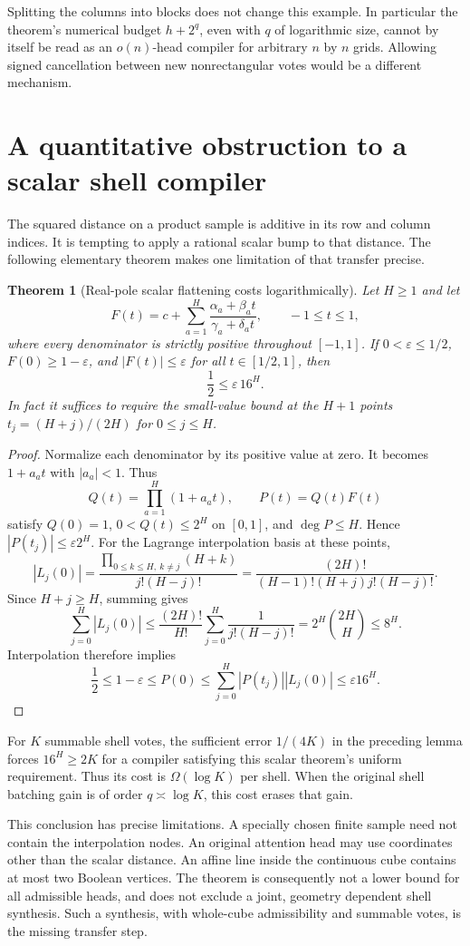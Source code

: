 \documentclass[11pt]{article}
\newtheorem{theorem}{Theorem}
\begin{document}
Splitting the columns into blocks does not change this example. In
particular the theorem's numerical budget $h+2^q$, even with
$q$ of logarithmic size, cannot by itself be read as an $o(n)$-head
compiler for arbitrary $n$ by $n$ grids. Allowing signed cancellation
between new nonrectangular votes would be a different mechanism.

\section{A quantitative obstruction to a scalar shell compiler}

The squared distance on a product sample is additive in its row and
column indices. It is tempting to apply a rational scalar bump to
that distance. The following elementary theorem makes one limitation
of that transfer precise.

\begin{theorem}[Real-pole scalar flattening costs logarithmically]
Let $H\ge1$ and let
\[
 F(t)=c+\sum_{a=1}^H
       \frac{\alpha_a+\beta_a t}{\gamma_a+\delta_a t},
 \qquad -1\le t\le1,
\]
where every denominator is strictly positive throughout $[-1,1]$.
If $0<\varepsilon\le1/2$, $F(0)\ge1-\varepsilon$, and
$|F(t)|\le\varepsilon$ for all $t\in[1/2,1]$, then
\[
 \frac12\le \varepsilon\,16^H.
\]
In fact it suffices to require the small-value bound at the $H+1$
points $t_j=(H+j)/(2H)$ for $0\le j\le H$.
\end{theorem}

\begin{proof}
Normalize each denominator by its positive value at zero. It becomes
$1+a_at$ with $|a_a|<1$. Thus
\[
 Q(t)=\prod_{a=1}^H(1+a_at),\qquad P(t)=Q(t)F(t)
\]
satisfy $Q(0)=1$, $0<Q(t)\le2^H$ on $[0,1]$, and
$\deg P\le H$. Hence $|P(t_j)|\le\varepsilon2^H$.
For the Lagrange interpolation basis at these points,
\[
 |L_j(0)|
 =\frac{\prod_{0\le k\le H,\ k\ne j}(H+k)}{j!(H-j)!}
 =\frac{(2H)!}{(H-1)!(H+j)j!(H-j)!}.
\]
Since $H+j\ge H$, summing gives
\[
 \sum_{j=0}^H|L_j(0)|
 \le \frac{(2H)!}{H!}
             \sum_{j=0}^H\frac1{j!(H-j)!}
 =2^H\binom{2H}{H}
 \le8^H.
\]
Interpolation therefore implies
\[
 \frac12\le1-\varepsilon\le P(0)
 \le\sum_{j=0}^H|P(t_j)||L_j(0)|
 \le\varepsilon16^H.
\]
\end{proof}

For $K$ summable shell votes, the sufficient error $1/(4K)$ in the
preceding lemma forces $16^H\ge2K$ for a compiler satisfying this
scalar theorem's uniform requirement. Thus its cost is
$\Omega(\log K)$ per shell. When the original shell batching gain is
of order $q\asymp\log K$, this cost erases that gain.

This conclusion has precise limitations. A specially chosen finite
sample need not contain the interpolation nodes. An original
attention head may use coordinates other than the scalar distance.
An affine line inside the continuous cube contains at most two
Boolean vertices. The theorem is consequently not a lower bound
for all admissible heads, and does not exclude a joint, geometry
dependent shell synthesis. Such a synthesis, with whole-cube
admissibility and summable votes, is the missing transfer step.
\end{document}
